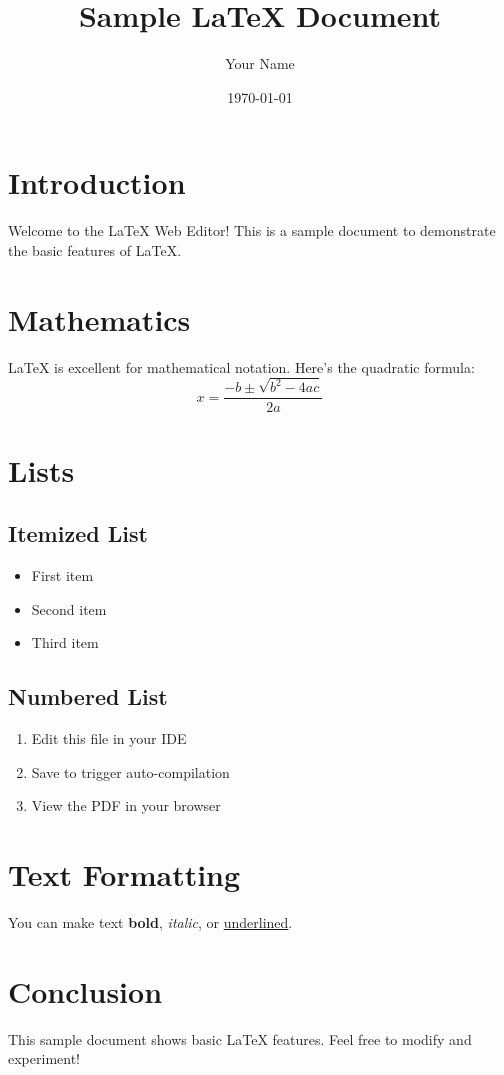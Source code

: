 \documentclass[12pt,a4paper]{article}
\title{Sample LaTeX Document}
\author{Your Name}
\date{\today}
\begin{document}
\maketitle

\section{Introduction}
Welcome to the LaTeX Web Editor! This is a sample document to demonstrate the basic features of LaTeX.

\section{Mathematics}
LaTeX is excellent for mathematical notation. Here's the quadratic formula:
\begin{equation}
    x = \frac{-b \pm \sqrt{b^2 - 4ac}}{2a}
\end{equation}

\section{Lists}
\subsection{Itemized List}
\begin{itemize}
    \item First item
    \item Second item
    \item Third item
\end{itemize}

\subsection{Numbered List}
\begin{enumerate}
    \item Edit this file in your IDE
    \item Save to trigger auto-compilation
    \item View the PDF in your browser
\end{enumerate}

\section{Text Formatting}
You can make text \textbf{bold}, \textit{italic}, or \underline{underlined}.

\section{Conclusion}
This sample document shows basic LaTeX features. Feel free to modify and experiment!
\end{document}
